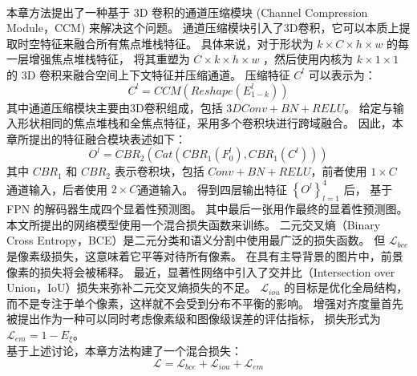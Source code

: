 \\
%
%
%
%
\indent
本章方法提出了一种基于 3D 卷积的通道压缩模块 (Channel Compression Module，CCM) 来解决这个问题。 
通道压缩模块引入了3D卷积，它可以本质上提取时空特征来融合所有焦点堆栈特征。
具体来说，对于形状为 $ k \times C \times h \times w $ 的每一层增强焦点堆栈特征，
将其重塑为 $ C \times  k \times  h \times w $ ，然后使用内核为 $ k \times 1 \times 1 $  的 3D 卷积来融合空间上下文特征并压缩通道。 压缩特征 $ C^{l} $ 可以表示为：
%
%
\begin{equation}
	C^{l} = CCM \left ( Reshape \left ( E_{1-k}^{l} \right ) \right )
\end{equation}
%
%
其中通道压缩模块主要由3D卷积组成，包括 $3DConv+BN+RELU$。 给定与输入形状相同的焦点堆栈和全焦点特征，采用多个卷积块进行跨域融合。 因此，本章所提出的特征融合模块表述如下：
%
%
%	
\begin{equation}
	O^{l}=CBR_{2}\left (Cat \left (CBR_{1} \left (F_{0}^{l} \right ),CBR_{1} \left (C^{l} \right ) \right ) \right )
\end{equation}
%
%
其中 $CBR_{1}$ 和 $CBR_{2}$ 表示卷积块，包括 $Conv+BN+RELU$，前者使用 $1 \times C$ 通道输入，后者使用 $2 \times C$通道输入。
得到四层输出特征 $\left \{ O^{l} \right \}_{l=1}^{4} $ 后， 基于 FPN 的解码器生成四个显着性预测图。 
其中最后一张用作最终的显着性预测图。 
%
%
%
%
%
%
%
本文所提出的网络模型使用一个混合损失函数来训练。
二元交叉熵（Binary Cross Entropy，BCE）是二元分类和语义分割中使用最广泛的损失函数。 但 $\mathcal L_{bce} $ 是像素级损失，这意味着它平等对待所有像素。
在具有主导背景的图片中，前景像素的损失将会被稀释。 最近，显著性网络中引入了交并比（Intersection over Union，IoU）损失来弥补二元交叉熵损失的不足。
$ \mathcal L_{iou} $ 的目标是优化全局结构，而不是专注于单个像素，这样就不会受到分布不平衡的影响。 增强对齐度量首先被提出作为一种可以同时考虑像素级和图像级误差的评估指标，
损失形式为 $ \mathcal L_{em} = 1 - E_{\xi} $。 
\\
%
%
%
%
\indent
基于上述讨论，本章方法构建了一个混合损失：
%
%
%
\begin{equation} 
	\mathcal L = \mathcal L_{bce} + \mathcal L_{iou}  + \mathcal L_{em}  
\end{equation}
%
%
%
%
\par
